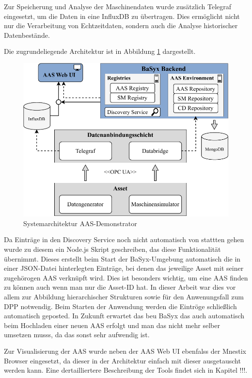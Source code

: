 Zur Speicherung und Analyse der Maschinendaten wurde zusätzlich Telegraf eingesetzt, um die Daten in eine InfluxDB zu übertragen. 
Dies ermöglicht nicht nur die Verarbeitung von Echtzeitdaten, sondern auch die Analyse historischer Datenbestände.

Die zugrundeliegende Architektur ist in Abbildung \ref{fig:Systemarchitektur} dargestellt.

\begin{figure}[htbp]
    \centering
        \includegraphics[width=1\textwidth]{Bilder/Ergebnisse/DynamischeDaten/Architektur.pdf}
    \caption{Systemarchitektur AAS-Demonstrator}
    \label{fig:Systemarchitektur}
\end{figure}

Da Einträge in den Discovery Service noch nicht automatisch von stattten gehen wurde zu diesem ein Node.js Skript geschreiben, das diese Funktionalität übernimmt.
Dieses erstellt beim Start der BaSyx-Umgebung automatisch die in einer JSON-Datei hinterlegten Einträge, bei denen das jeweilige Asset mit seiner zugehörogen AAS verknüpft wird.
Dies ist besonders wichtig, um eine AAS finden zu können auch wenn man nur die Asset-ID hat. In dieser Arbeit war dies vor allem zur Abbildung hierarchischer Strukturen sowie für den Anwenungsfall zum DPP notwendig.
Beim Starten der Anwendung werden die Eintröge schließlich automatisch geposted.
In Zukunft erwartet das beu BaSyx das auch automatisch beim Hochladen einer neuen AAS erfolgt und man das nicht mehr selber umsetzen musss, da das sonst sehr aufwendig ist.

Zur Visualisierung der AAS wurde neben der AAS Web UI ebenfalss der Mnestix Browser eingesetzt, da dieser in der Architektur einfach mit dieser ausgetauscht werden kann.
Eine dertailliertere Beschreibung der Tools findet sich in Kapitel !!!.

